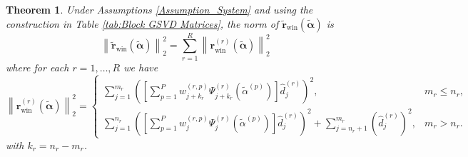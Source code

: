 \documentclass[12pt]{article}
\newcommand{\rVec}{\mathbf{r}}	%
\newcommand{\regparam}{\alpha}  %
\newcommand{\regparamVec}{\bm{\regparam}}   %
\newcommand{\regparamBig}{\widetilde{\regparam}}   %
\newcommand{\regparamVecBig}{\widetilde{\regparamVec}}   %
\newcommand{\rBig}{\widetilde{\rVec}}	%
\newcommand{\rWinBig}{\rBig_{\text{win}}}	%
\newcommand{\rWin}{\rVec_{\text{win}}}	%
\newtheorem{theorem}{Theorem}[section]
\begin{document}
\begin{theorem}
\label{thm:Regularized residual}
Under Assumptions \ref{Assumption_System} and using the construction in Table \ref{tab:Block GSVD Matrices}, the norm of $\rWinBig(\regparamVecBig)$ is
\[\left\|\rWinBig(\regparamVecBig)\right\|_2^2 = \sum_{r=1}^{R}\left\|\rWin^{(r)}(\regparamVecBig)\right\|_2^2\]
where for each $r = 1,\ldots,R$ we have
\[\left\|\rWin^{(r)}(\regparamVecBig)\right\|_2^2 = \begin{cases}
\sum_{j=1}^{m_r} \left(\left[\sum_{p=1}^{P} w_{j+k_r}^{(r,p)}\Psi_{j+k_r}^{(r)}\left(\regparamBig^{(p)}\right)\right] \hat{d}_j^{(r)}\right)^2, & m_r \leq n_r, \\
\sum_{j=1}^{n_r} \left(\left[\sum_{p=1}^{P} w_{j}^{(r,p)}\Psi_{j}^{(r)}\left(\regparamBig^{(p)}\right)\right] \hat{d}_j^{(r)}\right)^2 + \sum_{j = n_r + 1}^{m_r} \left(\hat{d}_j^{(r)}\right)^2, & m_r > n_r.
\end{cases}\]
with $k_r = n_r - m_r$.
\end{theorem}
\end{document}
